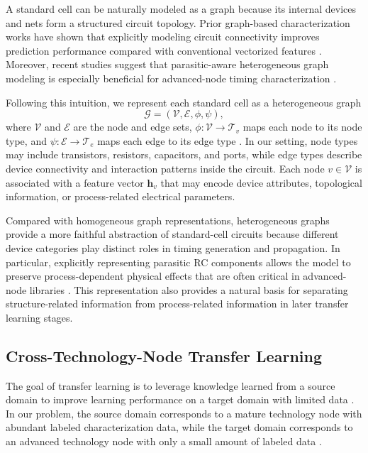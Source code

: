 A standard cell can be naturally modeled as a graph because its internal devices and nets form a structured circuit topology. Prior graph-based characterization works have shown that explicitly modeling circuit connectivity improves prediction performance compared with conventional vectorized features \cite{ma2024gnn,ye2024aging,liu2025gtncell}. Moreover, recent studies suggest that parasitic-aware heterogeneous graph modeling is especially beneficial for advanced-node timing characterization \cite{cheng2024hgat}.

Following this intuition, we represent each standard cell as a heterogeneous graph
\begin{equation}
    \mathcal{G} = (\mathcal{V}, \mathcal{E}, \phi, \psi),
\end{equation}
where $\mathcal{V}$ and $\mathcal{E}$ are the node and edge sets, $\phi: \mathcal{V} \rightarrow \mathcal{T}_v$ maps each node to its node type, and $\psi: \mathcal{E} \rightarrow \mathcal{T}_e$ maps each edge to its edge type \cite{yang2021hgat}. In our setting, node types may include transistors, resistors, capacitors, and ports, while edge types describe device connectivity and interaction patterns inside the circuit. Each node $v \in \mathcal{V}$ is associated with a feature vector $\mathbf{h}_v$ that may encode device attributes, topological information, or process-related electrical parameters.

Compared with homogeneous graph representations, heterogeneous graphs provide a more faithful abstraction of standard-cell circuits because different device categories play distinct roles in timing generation and propagation. In particular, explicitly representing parasitic RC components allows the model to preserve process-dependent physical effects that are often critical in advanced-node libraries \cite{cheng2024hgat}. This representation also provides a natural basis for separating structure-related information from process-related information in later transfer learning stages.

\subsection{Cross-Technology-Node Transfer Learning}

The goal of transfer learning is to leverage knowledge learned from a source domain to improve learning performance on a target domain with limited data \cite{weiss2016survey,zhuang2021survey}. In our problem, the source domain corresponds to a mature technology node with abundant labeled characterization data, while the target domain corresponds to an advanced technology node with only a small amount of labeled data \cite{shrestha2024arrival,amuru2024pvt,zhang2024disentangle}.

